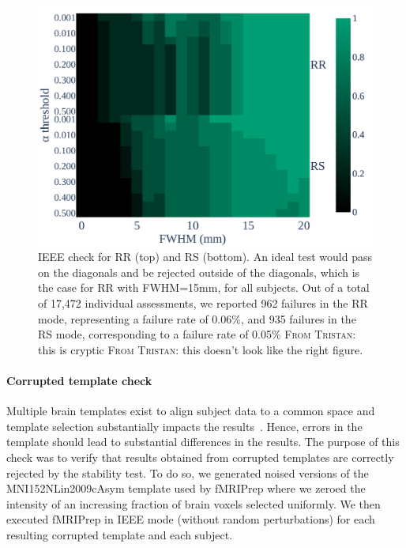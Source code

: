 \documentclass[lettersize,journal]{IEEEtran}
\newcommand{\TG}[1]{\color{blue}\textsc{From Tristan:} #1\color{black}\xspace}
\newcommand{\fmriprep}{fMRIPrep\xspace}
\begin{document}
\begin{figure}
    \centering
    \includegraphics[width=\linewidth]{figures/inter-subject/inter_mct_fwe_bonferroni.pdf}
    \caption{IEEE check for RR (top) and RS (bottom). An ideal test would pass on the diagonals and be rejected outside of the diagonals, which is the case for RR with FWHM=15mm, for all subjects. Out of a total of 17,472 individual assessments, we reported 962 failures in the RR mode, representing a failure rate of 0.06\%, and 935 failures in the RS mode, corresponding to a failure rate of 0.05\% \TG{this is cryptic} \TG{this doesn't look like the right figure}.
    }
    \label{fig:ieee-check}
\end{figure}

\paragraph{Corrupted template check}

Multiple brain templates exist to align subject data to a common space and template selection substantially impacts the results~\cite{li2021moving}. Hence, errors in the template should lead to substantial differences in the results. The purpose of this check was to verify that results obtained from corrupted templates are correctly rejected by the stability test.
To do so, we generated noised versions of the MNI152NLin2009cAsym template used by \fmriprep where we zeroed the intensity of an increasing fraction of brain voxels selected uniformly. We then executed \fmriprep in IEEE mode (without random perturbations) for each resulting corrupted template and each subject.
\end{document}
